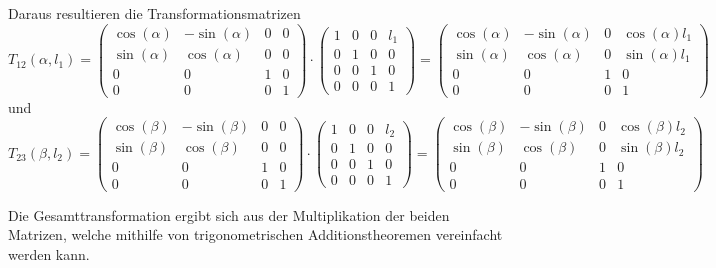 \documentclass{MSM_latex}
\begin{document}
Daraus resultieren die Transformationsmatrizen
\begin{equation*}
	T_{12}(\alpha, l_1) = \begin{pmatrix}
	\cos(\alpha) & -\sin(\alpha) & 0 & 0 \\
	\sin(\alpha) & \cos(\alpha) & 0 & 0 \\
	0 & 0 & 1 & 0 \\
	0 & 0 & 0 & 1
	\end{pmatrix} \cdot \begin{pmatrix}
	1 & 0 & 0 & l_1 \\
	0 & 1 & 0 & 0 \\
	0 & 0 & 1 & 0 \\
	0 & 0 & 0 & 1
	\end{pmatrix} = \begin{pmatrix}
	\cos(\alpha) & -\sin(\alpha) & 0 & \cos(\alpha) l_1 \\
	\sin(\alpha) & \cos(\alpha) & 0 & \sin(\alpha) l_1 \\
	0 & 0 & 1 & 0 \\
	0 & 0 & 0 & 1
	\end{pmatrix}
\end{equation*}
und
\begin{equation*}
	T_{23}(\beta, l_2) = \begin{pmatrix}
	\cos(\beta) & -\sin(\beta) & 0 & 0 \\
	\sin(\beta) & \cos(\beta) & 0 & 0 \\
	0 & 0 & 1 & 0 \\
	0 & 0 & 0 & 1
	\end{pmatrix} \cdot \begin{pmatrix}
	1 & 0 & 0 & l_2 \\
	0 & 1 & 0 & 0 \\
	0 & 0 & 1 & 0 \\
	0 & 0 & 0 & 1
	\end{pmatrix} = \begin{pmatrix}
	\cos(\beta) & -\sin(\beta) & 0 & \cos(\beta) l_2 \\
	\sin(\beta) & \cos(\beta) & 0 & \sin(\beta) l_2 \\
	0 & 0 & 1 & 0 \\
	0 & 0 & 0 & 1
	\end{pmatrix}
\end{equation*}

Die Gesamttransformation ergibt sich aus der Multiplikation der beiden Matrizen, welche mithilfe von trigonometrischen Additionstheoremen vereinfacht werden kann.
\end{document}
